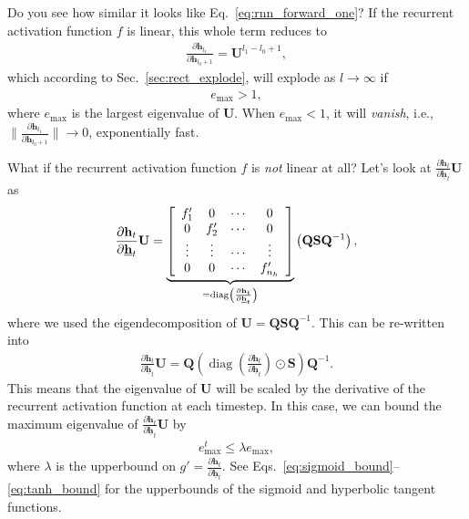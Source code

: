 \documentclass{report}
\newcommand{\vect}[1]{\mathbf{#1}}
\newcommand{\matr}[1]{\mathbf{#1}}
\newcommand{\diag}[0]{\operatorname{diag}}
\newcommand{\vh}[0]{\vect{h}}
\newcommand{\mQ}[0]{\matr{Q}}
\newcommand{\mU}[0]{\matr{U}}
\newcommand{\mS}{\matr{S}}
\begin{document}
Do you see how similar it looks like Eq.~\eqref{eq:rnn_forward_one}? If the recurrent
activation function $f$ is linear, this whole term reduces to
\begin{align*}
    \frac{\partial \vh_{l_1}}{\partial \vh_{l_0+1}} = \mU^{l_1-l_0+1},
\end{align*}
which according to Sec.~\ref{sec:rect_explode}, will explode as $l\to\infty$ if
\begin{align*}
    e_{\max} > 1,
\end{align*}
where $e_{\max}$ is the largest eigenvalue of $\mU$. When $e_{\max} < 1$, it
will {\em vanish}, i.e., $\|\frac{\partial \vh_{l_1}}{\partial \vh_{l_0+1}}\|
\to 0$, exponentially fast.

What if the recurrent activation function $f$ is {\em not} linear at all? Let's
look at $\frac{\partial \vh_{t}}{\partial \underline{\vh}_{t}} \mU$ as 
\begin{align*}
    \frac{\partial \vh_{t}}{\partial \underline{\vh}_{t}} \mU = 
        \underbrace{
    \left[ 
            \begin{array}{c c c c}
                f_1' & 0 & \cdots & 0 \\
                0 & f_2' & \cdots & 0 \\
                \vdots & \vdots & \cdots & \vdots \\
                0 & 0 & \cdots & f_{n_h}'
            \end{array}
    \right] 
        }_{=\diag\left( \frac{\partial \vh_{t}}{\partial \underline{\vh}_{t}}\right)}
    \left(\mQ \mS \mQ^{-1}\right),
\end{align*}
where we used the eigendecomposition of $\mU=\mQ \mS \mQ^{-1}$. This can be
re-written into
\begin{align*}
    \frac{\partial \vh_{t}}{\partial \underline{\vh}_{t}} \mU = 
    \mQ \left( \diag\left(\frac{\partial \vh_{t}}{\partial
            \underline{\vh}_{t}}\right)
    \odot \mS \right) \mQ^{-1}.
\end{align*}
This means that the eigenvalue of $\mU$ will be scaled by the derivative of the
recurrent activation function at each timestep. In this case, we can bound the
maximum eigenvalue of $\frac{\partial \vh_{t}}{\partial \underline{\vh}_{t}}
\mU$ by
\begin{align*}
    e_{\max}^t \leq \lambda e_{\max},
\end{align*}
where $\lambda$ is the upperbound on $g'=\frac{\partial \vh_{t}}{\partial
\underline{\vh}_{t}}$. See Eqs.~\eqref{eq:sigmoid_bound}--\eqref{eq:tanh_bound}
for the upperbounds of the sigmoid and hyperbolic tangent functions.
\end{document}
